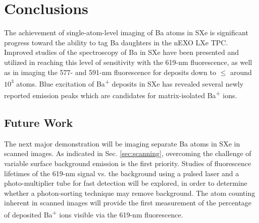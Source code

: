 \chapter{Conclusions}

The achievement of single-atom-level imaging of Ba atoms in SXe is significant progress toward the ability to tag Ba daughters in the nEXO LXe TPC.  Improved studies of the spectroscopy of Ba in SXe have been presented and utilized in reaching this level of sensitivity with the 619-nm fluorescence, as well as in imaging the 577- and 591-nm fluorescence for deposits down to $\leq$ around $10^{3}$ atoms.  Blue excitation of Ba\textsuperscript{+} deposits in SXe has revealed several newly reported emission peaks which are candidates for matrix-isolated Ba\textsuperscript{+} ions.



\section{Future Work}
\label{sec:future}

The next major demonstration will be imaging separate Ba atoms in SXe in scanned images.  As indicated in Sec. \ref{sec:scanning}, overcoming the challenge of variable surface background emission is the first priority.  Studies of fluorescence lifetimes of the 619-nm signal vs. the background using a pulsed laser and a photo-multiplier tube for fast detection will be explored, in order to determine whether a photon-sorting technique may remove background.  The atom counting inherent in scanned images will provide the first measurement of the percentage of deposited Ba\textsuperscript{+} ions visible via the 619-nm fluorescence.

